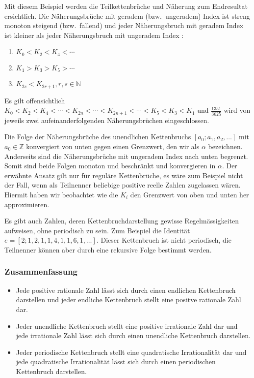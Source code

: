Mit diesem Beispiel werden die Teilkettenbrüche und Näherung zum Endresultat
ersichtlich.
Die Näherungsbrüche mit geradem (bzw.~ungeradem) Index
ist streng monoton steigend (bzw.~fallend) und jeder Näherungsbruch
mit geradem Index ist kleiner als jeder Näherungsbruch mit ungeradem
Index \cite{kettenbruch:proseminar}:
\begin{enumerate}
\item
$K_0 < K_2 < K_4 < \cdots$
\item
$K_1 > K_3 > K_5 > \cdots$
\item
$K_{2s} < K_{2r+1}, r,s \in \mathbb{N}$
\end{enumerate}

Es gilt offensichtlich
$K_0 < K_2 < K_4 < \cdots < K_{2n} < \cdots < K_{2n+1} < \cdots < K_5
< K_3 < K_1$
und $\frac{1351}{3625}$ wird von jeweils zwei aufeinanderfolgenden
Näherungsbrüchen eingeschlossen.

Die Folge der Näherungsbrüche des unendlichen Kettenbruchs
$[a_0;a_1,a_2,\dots]$ mit $a_0 \in \mathbb{Z}$ konvergiert 
von unten gegen einen Grenzwert, den wir als $\alpha$
bezeichnen.
Anderseits sind die Näherungsbrüche mit ungeradem
Index nach unten begrenzt.
Somit sind beide Folgen monoton und beschränkt 
und konvergieren in $\alpha$.
Der erwähnte Ansatz gilt nur für reguläre Kettenbrüche, es 
wäre zum Beispiel nicht der Fall, wenn als Teilnenner beliebige positive
reelle Zahlen zugelassen wären. 
Hiermit haben wir beobachtet wie die $K_i$ den Grenzwert von oben und
unten her approximieren.

Es gibt auch Zahlen, deren Kettenbruchdarstellung gewisse
Regelmässigkeiten aufweisen, ohne periodisch zu sein. Zum Beispiel
die Identität $e = [2;1,2,1,1,4,1,1,6,1,\dots]$. Dieser
Kettenbruch ist nicht periodisch, die Teilnenner können aber durch
eine rekursive Folge bestimmt werden.

\subsubsection{Zusammenfassung}
\begin{itemize}
\item
Jede positive rationale Zahl lässt sich durch einen endlichen
Kettenbruch darstellen und jeder endliche Kettenbruch stellt eine
positve rationale Zahl dar.
\item
Jeder unendliche Kettenbruch stellt eine positive irrationale Zahl
dar und jede irrationale Zahl lässt sich durch einen unendliche
Kettenbruch darstellen.
\item
Jeder periodische Kettenbruch stellt eine quadratische Irrationalität
dar und jede quadratische Irrationalität lässt sich durch einen
periodischen Kettenbruch darstellen.
\end{itemize}
